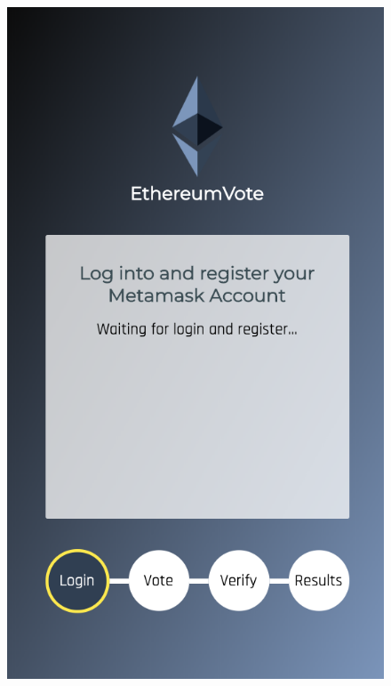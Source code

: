 	\begin{figure}
		\centering
		\includegraphics[width=\linewidth/3]{img/screen_login.png}

\end{figure}

